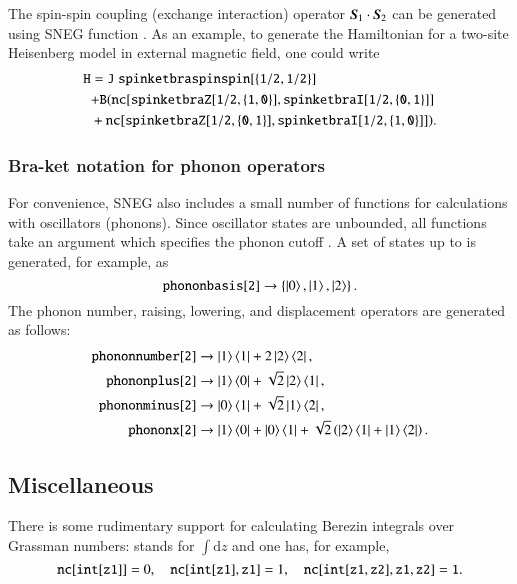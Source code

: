 \documentclass[3p,number,preprint]{elsarticle}
\begin{document}
The spin-spin coupling (exchange interaction) operator $\boldsymbol{S}_1 \cdot
\boldsymbol{S}_2$ can be generated using SNEG function
. As an example, to generate the Hamiltonian
for a two-site Heisenberg model in external magnetic field, one could
write
%
\begin{equation}
\begin{split}
{\tt H}&={\tt J\ spinketbraspinspin[\{1/2,1/2\}]} \\
&{\tt + B (nc[spinketbraZ[1/2,\{1,0\}], spinketbraI[1/2,\{0,1\}]]}\\
&+{\tt nc[spinketbraZ[1/2,\{0,1\}], spinketbraI[1/2,\{1,0\}]])}.
\end{split}
\end{equation}


\subsubsection{Bra-ket notation for phonon operators}

For convenience, SNEG also includes a small number of functions for
calculations with oscillators (phonons). Since oscillator states are
unbounded, all functions take an argument which specifies the phonon
cutoff . A set of states up to  is generated, for
example, as
%
\begin{equation}
{\tt phononbasis[2]} \to \left\{ \left| 0 \right\rangle, \left| 1 \right\rangle, \left| 2 \right\rangle \right\}.
\end{equation}
%
The phonon number, raising, lowering, and displacement operators are
generated as follows:
%
\begin{equation}
\begin{split}
{\tt phononnumber[2]} &\to \left| 1 \right\rangle \left\langle 1 \right| + 2 \left| 2 \right\rangle\left\langle 2 \right|, \\
{\tt phononplus[2]} &\to \left| 1 \right\rangle\left\langle 0 \right| + \sqrt{2} \left| 2 \right\rangle \left\langle 1 \right|, \\
{\tt phononminus[2]} &\to \left| 0 \right\rangle\left\langle 1 \right| + \sqrt{2} \left| 1 \right\rangle\left\langle 2 \right|, \\
{\tt phononx[2]} &\to \left| 1 \right\rangle\left\langle 0 \right| + \left| 0 \right\rangle\left\langle 1 \right| + \sqrt{2} 
\left( \left| 2 \right\rangle\left\langle 1 \right| + \left| 1 \right\rangle\left\langle 2 \right| \right).
\end{split}
\end{equation}



\subsection{Miscellaneous}

There is some rudimentary support for calculating Berezin integrals
over Grassman numbers:  stands for $\int{\mathrm{d}z}$
and one has, for example,
%
\begin{equation}
{\tt nc[int[z1]]}=0,
\quad
{\tt nc[int[z1],z1]}=1,
\quad
{\tt nc[int[z1,z2],z1,z2]=1}.
\end{equation}
\end{document}
